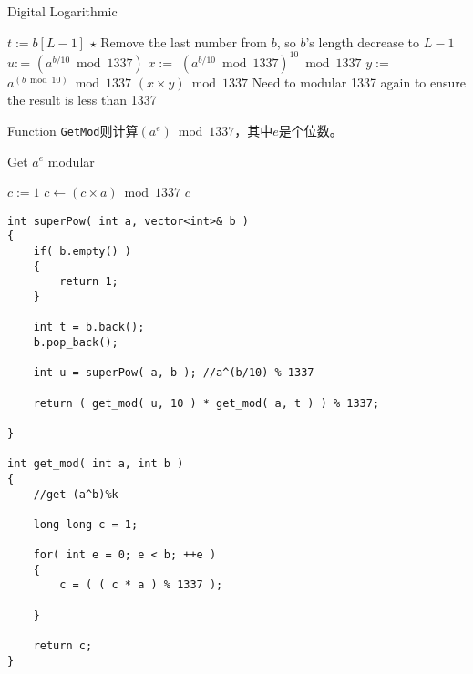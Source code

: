 \setcounter{algorithm}{0}
\begin{algorithm}[H]
\caption{Digital Logarithmic}
\begin{algorithmic}[1]
\State {}
\EndIf
\State $t:=b[L-1]$
\State $\star$ Remove the last number from $b$, so $b$'s length decrease to $L-1$
\State $u:$= \Comment $(a^{b/10}\bmod 1337)$
\State $x:=$ \Comment $ (a^{b/10}\bmod 1337) ^ {10}\bmod 1337 $
\State $y:=$ \Comment $a^{(b\bmod 10)}\bmod 1337$
\State \Return $(x\times y)\bmod 1337$ \Comment Need to modular 1337 again to ensure the result is less than 1337
\end{algorithmic}
\end{algorithm}
\begin{algorithm}[H]
\begin{algorithmic}[1]
\EndProcedure
\end{algorithmic}
\end{algorithm}

Function \texttt{GetMod}则计算$(a^e)\bmod 1337$，其中$e$是个位数。

\begin{algorithm}[H]
\caption{Get $a^e$ modular}
\begin{algorithmic}[1]
\State $c:=1$
\State $c\gets (c\times a)\bmod 1337$
\EndFor
\State \Return $c$
\EndFunction
\end{algorithmic}
\end{algorithm}

\setcounter{lstlisting}{0}
\begin{lstlisting}[style=customc, caption={Digital Modular}]
int superPow( int a, vector<int>& b )
{
    if( b.empty() )
    {
        return 1;
    }

    int t = b.back();
    b.pop_back();

    int u = superPow( a, b ); //a^(b/10) % 1337

    return ( get_mod( u, 10 ) * get_mod( a, t ) ) % 1337;

}

int get_mod( int a, int b )
{
    //get (a^b)%k

    long long c = 1;

    for( int e = 0; e < b; ++e )
    {
        c = ( ( c * a ) % 1337 );

    }

    return c;
}
\end{lstlisting}